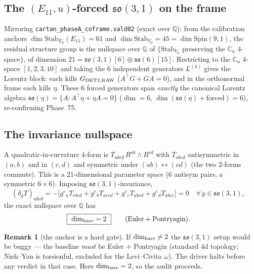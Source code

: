 \documentclass[11pt]{article}
\newcommand{\Q}{\mathbb{Q}}
\newcommand{\om}{\omega}
\newcommand{\so}{\mathfrak{so}}
\theoremstyle{definition}\newtheorem{remark}{Remark}
\theoremstyle{definition}\newtheorem{definition}{Definition}
\theoremstyle{plain}\newtheorem{proposition}{Proposition}
\theoremstyle{plain}\newtheorem{lemma}{Lemma}
\begin{document}
\subsection{The $(E_{11},u)$-forced $\so(3,1)$ on the frame}
Mirroring \texttt{cartan\_phaseA\_coframe.vald02} (exact over $\Q$): from the
calibration anchors $\dim\mathrm{Stab}_{E_6}(E_{11})=61$ and
$\dim\mathrm{Stab}_{V_0}=45=\dim\mathrm{Spin}(9,1)$, the residual structure group is
the nullspace over $\Q$ of $\{\mathrm{Stab}_{V_0}\text{ preserving the }\mathbb{C}_u$
$4$-space$\}$, of dimension $21=\so(3,1)[6]\oplus\so(6)[15]$. Restricting to the
$\mathbb{C}_u$ $4$-space $[1,2,3,10]$ and taking the $6$ independent generators
$L^{(k)}$ gives the Lorentz block: each kills $G_{\rm DET2,RAW}$ ($A^{\!\top}G+GA=0$),
and in the orthonormal frame each kills $\eta$. These $6$ forced generators span
\emph{exactly} the canonical Lorentz algebra $\so(\eta)=\{A:A^{\!\top}\eta+\eta A=0\}$
($\dim=6$, $\dim(\so(\eta)+\text{forced})=6$), re-confirming Phase~75.

\subsection{The invariance nullspace}
A quadratic-in-curvature $4$-form is $T_{abcd}\,R^{ab}\wedge R^{cd}$ with $T_{abcd}$
antisymmetric in $(a,b)$ and in $(c,d)$ and symmetric under $(ab)\leftrightarrow(cd)$
(the two $2$-forms commute). This is a $21$-dimensional parameter space ($6$ antisym
pairs, a symmetric $6\times6$). Imposing $\so(3,1)$-invariance,
\begin{equation}
  (\delta_g T)_{abcd}=-\bigl[g^e{}_a T_{ebcd}+g^e{}_b T_{aecd}
  +g^e{}_c T_{abed}+g^e{}_d T_{abce}\bigr]=0
  \quad\forall\,g\in\so(3,1),
\end{equation}
the exact nullspace over $\Q$ has
\begin{equation}\boxed{\ \dim_{\rm bare}=2\ }\qquad(\text{Euler}+\text{Pontryagin}).\end{equation}

\begin{remark}[the anchor is a hard gate]
If $\dim_{\rm bare}\neq2$ the $\so(3,1)$ setup would be buggy --- the baseline
\emph{must} be Euler $+$ Pontryagin (standard $4$d topology; Nieh--Yan is torsionful,
excluded for the Levi--Civita $\om$). The driver halts before any verdict in that
case. Here $\dim_{\rm bare}=2$, so the audit proceeds.
\end{remark}
\end{document}
